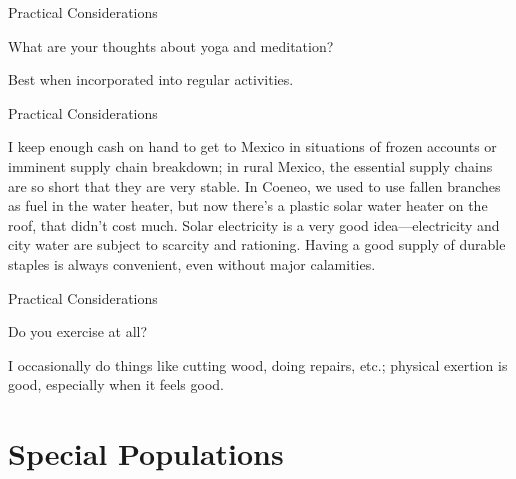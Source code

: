 \documentclass[11pt,oneside,openany,extrafontsizes]{memoir}
\begin{document}
\begin{qaexchange}{Practical Considerations}

    \begin{question}
        What are your thoughts about yoga and meditation?
    \end{question}

    \begin{answer}
      Best when incorporated into regular activities.
    \end{answer}
\end{qaexchange}

\begin{standalonequote}{Practical Considerations}

    \begin{answer}
      I keep enough cash on hand to get to Mexico in situations of frozen accounts or imminent supply chain breakdown; in rural Mexico, the essential supply chains are so short that they are very stable. In Coeneo, we used to use fallen branches as fuel in the water heater, but now there's a plastic solar water heater on the roof, that didn't cost much. Solar electricity is a very good idea—electricity and city water are subject to scarcity and rationing. Having a good supply of durable staples is always convenient, even without major calamities.
    \end{answer}
\end{standalonequote}

\begin{qaexchange}{Practical Considerations}

    \begin{question}
        Do you exercise at all?
    \end{question}

    \begin{answer}
      I occasionally do things like cutting wood, doing repairs, etc.; physical exertion is good, especially when it feels good.
    \end{answer}
\end{qaexchange}

\section{Special Populations}
\end{document}

